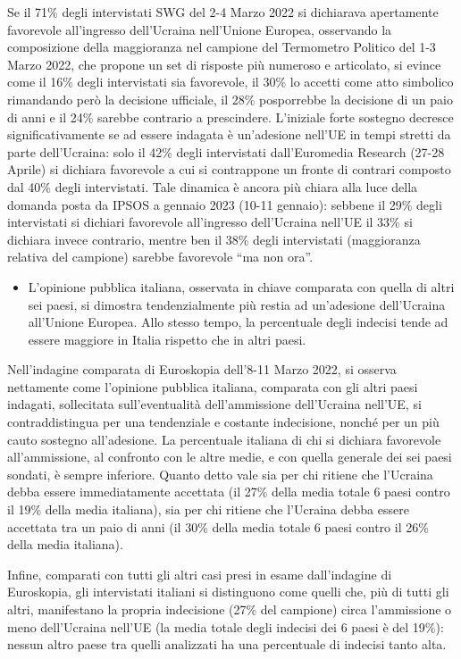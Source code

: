 \documentclass[
  openany]{book}
\providecommand{\tightlist}{%
  \setlength{\itemsep}{0pt}\setlength{\parskip}{0pt}}
\begin{document}
Se il 71\% degli intervistati SWG del 2-4 Marzo 2022 si dichiarava apertamente favorevole all'ingresso dell'Ucraina nell'Unione Europea, osservando la composizione della maggioranza nel campione del Termometro Politico del 1-3 Marzo 2022, che propone un set di risposte più numeroso e articolato, si evince come il 16\% degli intervistati sia favorevole, il 30\% lo accetti come atto simbolico rimandando però la decisione ufficiale, il 28\% posporrebbe la decisione di un paio di anni e il 24\% sarebbe contrario a prescindere. L'iniziale forte sostegno decresce significativamente se ad essere indagata è un'adesione nell'UE in tempi stretti da parte dell'Ucraina: solo il 42\% degli intervistati dall'Euromedia Research (27-28 Aprile) si dichiara favorevole a cui si contrappone un fronte di contrari composto dal 40\% degli intervistati. Tale dinamica è ancora più chiara alla luce della domanda posta da IPSOS a gennaio 2023 (10-11 gennaio): sebbene il 29\% degli intervistati si dichiari favorevole all'ingresso dell'Ucraina nell'UE il 33\% si dichiara invece contrario, mentre ben il 38\% degli intervistati (maggioranza relativa del campione) sarebbe favorevole ``ma non ora''.

\begin{itemize}
\tightlist
\item
  L'opinione pubblica italiana, osservata in chiave comparata con quella di altri sei paesi, si dimostra tendenzialmente più restia ad un'adesione dell'Ucraina all'Unione Europea. Allo stesso tempo, la percentuale degli indecisi tende ad essere maggiore in Italia rispetto che in altri paesi.
\end{itemize}

Nell'indagine comparata di Euroskopia dell'8-11 Marzo 2022, si osserva nettamente come l'opinione pubblica italiana, comparata con gli altri paesi indagati, sollecitata sull'eventualità dell'ammissione dell'Ucraina nell'UE, si contraddistingua per una tendenziale e costante indecisione, nonché per un più cauto sostegno all'adesione. La percentuale italiana di chi si dichiara favorevole all'ammissione, al confronto con le altre medie, e con quella generale dei sei paesi sondati, è sempre inferiore.
Quanto detto vale sia per chi ritiene che l'Ucraina debba essere immediatamente accettata (il 27\% della media totale 6 paesi contro il 19\% della media italiana), sia per chi ritiene che l'Ucraina debba essere accettata tra un paio di anni (il 30\% della media totale 6 paesi contro il 26\% della media italiana).

Infine, comparati con tutti gli altri casi presi in esame dall'indagine di Euroskopia, gli intervistati italiani si distinguono come quelli che, più di tutti gli altri, manifestano la propria indecisione (27\% del campione) circa l'ammissione o meno dell'Ucraina nell'UE (la media totale degli indecisi dei 6 paesi è del 19\%): nessun altro paese tra quelli analizzati ha una percentuale di indecisi tanto alta.
\end{document}
